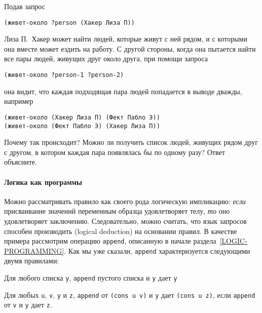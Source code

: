 \begin{exercise}{4.60}%
\label{EX4.60}%
\nopagebreak
\samepage
Подав запрос

\begin{Verbatim}[fontsize=\small]
(живет-около ?person (Хакер Лиза П))
\end{Verbatim}
Лиза П.~Хакер может найти людей, которые живут с ней рядом, и с
которыми она вместе может ездить на работу.  С другой стороны, когда
она пытается найти все пары людей, живущих друг около друга, при
помощи запроса

\begin{Verbatim}[fontsize=\small]
(живет-около ?person-1 ?person-2)
\end{Verbatim}
она видит, что каждая подходящая пара людей попадается в выводе
дважды, например

\begin{Verbatim}[fontsize=\small]
(живет-около (Хакер Лиза П) (Фект Пабло Э))
(живет-около (Фект Пабло Э) (Хакер Лиза П))
\end{Verbatim}
Почему так происходит?  Можно ли получить список людей, живущих рядом друг
с другом, в котором каждая пара появлялась бы по одному разу?
Ответ объясните.
\end{exercise}

\paragraph{Логика как программы}

Можно рассматривать правило как своего рода логическую
импликацию: {\em если} присваивание значений переменным образца
удовлетворяет телу, {\em то} оно удовлетворяет заключению.
Следовательно, можно считать, что язык запросов способен производить
 (logical deduction) на основании
правил.  В качестве примера рассмотрим операцию {\tt append},
описанную в начале раздела~\ref{LOGIC-PROGRAMMING}.  Как
мы уже сказали, {\tt append} характеризуется следующими двумя
правилами:

\begin{plainlist}
\item
Для любого списка {\tt y}, {\tt append} пустого
списка и {\tt y} дает {\tt y}

\item
Для любых {\tt u}, {\tt v},
{\tt y} и {\tt z}, {\tt append} от {\tt (cons u
v)} и {\tt y} дает {\tt (cons u z)}, если
{\tt append} от {\tt v} и {\tt y} дает
{\tt z}.
\end{plainlist}

